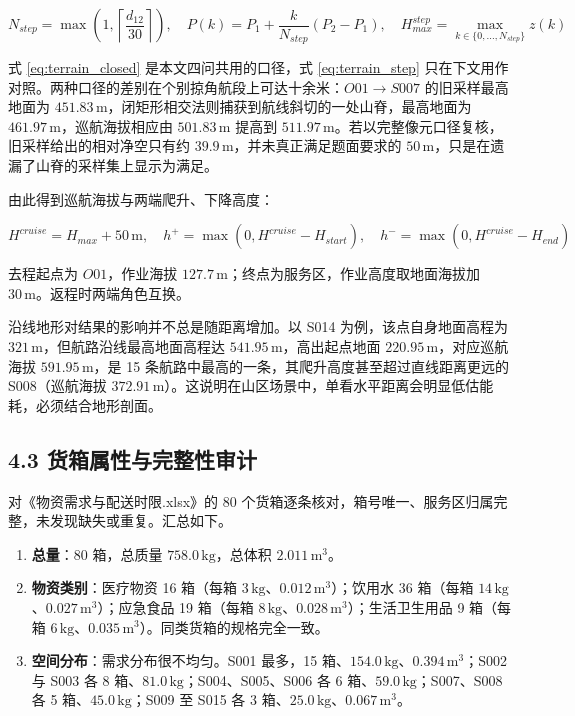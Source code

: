 \documentclass[withoutpreface,bwprint]{format}
\begin{document}
\begin{equation}
N_{step} = \max\left(1, \left\lceil \frac{d_{12}}{30} \right\rceil\right), \quad P(k) = P_1 + \frac{k}{N_{step}} (P_2 - P_1), \quad
H_{max}^{step} = \max_{k \in \{0, \dots, N_{step}\}} z(k)
\label{eq:terrain_step}
\end{equation}

式 \ref{eq:terrain_closed} 是本文四问共用的口径，式 \ref{eq:terrain_step} 只在下文用作对照。两种口径的差别在个别掠角航段上可达十余米：$O01 \to S007$ 的旧采样最高地面为 $451.83\,\text{m}$，闭矩形相交法则捕获到航线斜切的一处山脊，最高地面为 $461.97\,\text{m}$，巡航海拔相应由 $501.83\,\text{m}$ 提高到 $511.97\,\text{m}$。若以完整像元口径复核，旧采样给出的相对净空只有约 $39.9\,\text{m}$，并未真正满足题面要求的 $50\,\text{m}$，只是在遗漏了山脊的采样集上显示为满足。

由此得到巡航海拔与两端爬升、下降高度：

\begin{equation}
H^{cruise} = H_{max} + 50\,\text{m}, \quad h^+ = \max(0, H^{cruise} - H_{start}), \quad h^- = \max(0, H^{cruise} - H_{end})
\end{equation}

去程起点为 $O01$，作业海拔 $127.7\,\text{m}$；终点为服务区，作业高度取地面海拔加 $30\,\text{m}$。返程时两端角色互换。

沿线地形对结果的影响并不总是随距离增加。以 S014 为例，该点自身地面高程为 $321\,\text{m}$，但航路沿线最高地面高程达 $541.95\,\text{m}$，高出起点地面 $220.95\,\text{m}$，对应巡航海拔 $591.95\,\text{m}$，是 15 条航路中最高的一条，其爬升高度甚至超过直线距离更远的 S008（巡航海拔 $372.91\,\text{m}$）。这说明在山区场景中，单看水平距离会明显低估能耗，必须结合地形剖面。

\subsection{4.3 货箱属性与完整性审计}
对《物资需求与配送时限.xlsx》的 80 个货箱逐条核对，箱号唯一、服务区归属完整，未发现缺失或重复。汇总如下。

\begin{enumerate}[leftmargin=*]
    \item \textbf{总量}：80 箱，总质量 $758.0\,\text{kg}$，总体积 $2.011\,\text{m}^3$。
    \item \textbf{物资类别}：医疗物资 16 箱（每箱 $3\,\text{kg}$、$0.012\,\text{m}^3$）；饮用水 36 箱（每箱 $14\,\text{kg}$、$0.027\,\text{m}^3$）；应急食品 19 箱（每箱 $8\,\text{kg}$、$0.028\,\text{m}^3$）；生活卫生用品 9 箱（每箱 $6\,\text{kg}$、$0.035\,\text{m}^3$）。同类货箱的规格完全一致。
    \item \textbf{空间分布}：需求分布很不均匀。S001 最多，15 箱、$154.0\,\text{kg}$、$0.394\,\text{m}^3$；S002 与 S003 各 8 箱、$81.0\,\text{kg}$；S004、S005、S006 各 6 箱、$59.0\,\text{kg}$；S007、S008 各 5 箱、$45.0\,\text{kg}$；S009 至 S015 各 3 箱、$25.0\,\text{kg}$、$0.067\,\text{m}^3$。
\end{enumerate}
\end{document}
